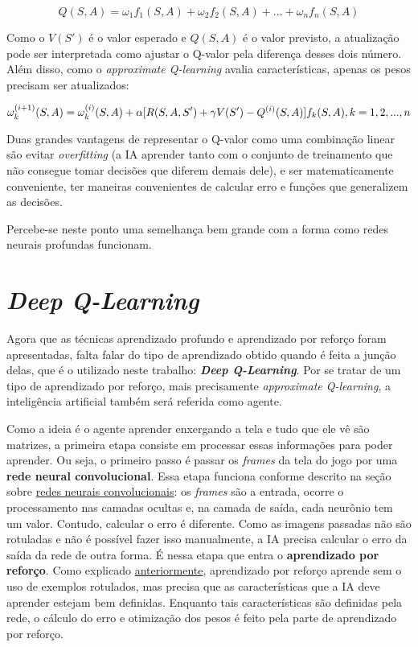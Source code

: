 \begin{equation} \label{eq:q_lin_comb}
Q(S,A) = \omega_{1}f_{1}(S,A) + \omega_{2}f_{2}(S,A) + ... + \omega_{n}f_{n}(S,A)
\end{equation}

Como o $V(S')$ é o valor esperado e $Q(S,A)$ é o valor previsto, a atualização pode ser interpretada como ajustar o Q-valor pela diferença desses dois número. Além disso, como o \textit{approximate Q-learning} avalia características, apenas os pesos precisam ser atualizados:

\begin{equation} \label{eq:w_update}
\omega_{k}^{(i+1)}(S,A) = \omega_{k}^{(i)}(S,A) + \alpha[R(S,A,S') + \gamma V(S') - Q^{(i)}(S,A)]f_{k}(S,A), \hfill k = 1, 2, ..., n
\end{equation}

Duas grandes vantagens de representar o Q-valor como uma combinação linear são evitar \textit{overfitting} (a IA aprender tanto com o conjunto de treinamento que não consegue tomar decisões que diferem demais dele), e ser matematicamente conveniente, ter maneiras convenientes de calcular erro e funções que generalizem as decisões.

Percebe-se neste ponto uma semelhança bem grande com a forma como redes neurais profundas funcionam.


\section{\textit{Deep Q-Learning}}
\label{sec:dql}

Agora que as técnicas aprendizado profundo e aprendizado por reforço foram apresentadas, falta falar do tipo de aprendizado obtido quando é feita a junção delas, que é o utilizado neste trabalho: \textit{\textbf{Deep Q-Learning}}.
Por se tratar de um tipo de aprendizado por reforço, mais precisamente \textit{approximate Q-learning}, a inteligência artificial também será referida como agente.

Como a ideia é o agente aprender enxergando a tela e tudo que ele vê são matrizes, a primeira etapa consiste em processar essas informações para poder aprender.
Ou seja, o primeiro passo é passar os \textit{frames} da tela do jogo por uma \textbf{rede neural convolucional}.
Essa etapa funciona conforme descrito na seção sobre \hyperref[sec:cnn]{redes neurais convolucionais}: os \textit{frames} são a entrada, ocorre o processamento nas camadas ocultas e, na camada de saída, cada neurônio tem um valor.
Contudo, calcular o erro é diferente.
Como as imagens passadas não são rotuladas e não é possível fazer isso manualmente, a IA precisa calcular o erro da saída da rede de outra forma.
É nessa etapa que entra o \textbf{aprendizado por reforço}.
Como explicado \hyperref[sec:rl]{anteriormente}, aprendizado por reforço aprende sem o uso de exemplos rotulados, mas precisa que as características que a IA deve aprender estejam bem definidas.
Enquanto tais características são definidas pela rede, o cálculo do erro e otimização dos pesos é feito pela parte de aprendizado por reforço.

